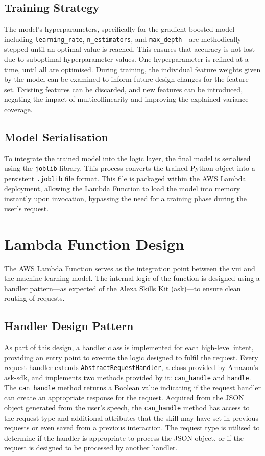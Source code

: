 \subsection{Training Strategy}
The model's hyperparameters, specifically for the gradient boosted model---including \texttt{learnin\-g\_r\-ate}, \texttt{n\_estimators}, and \texttt{max\_depth}---are methodically stepped until an optimal value is reached. This ensures that accuracy is not lost due to suboptimal hyperparameter values. One hyperparameter is refined at a time, until all are optimised. During training, the individual feature weights given by the model can be examined to inform future design changes for the feature set. Existing features can be discarded, and new features can be introduced, negating the impact of multicollinearity and improving the explained variance coverage.

\subsection{Model Serialisation}
To integrate the trained model into the logic layer, the final model is serialised using the \texttt{joblib} library. This process converts the trained Python object into a persistent \texttt{.joblib} file format. This file is packaged within the AWS Lambda deployment, allowing the Lambda Function to load the model into memory instantly upon invocation, bypassing the need for a training phase during the user's request.

\section{Lambda Function Design}
The AWS Lambda Function serves as the integration point between the \gls{vui} and the machine learning model. The internal logic of the function is designed using a handler pattern---as expected of the Alexa Skills Kit (\gls{ask})---to ensure clean routing of requests.

\subsection{Handler Design Pattern}
\label{sub:handlerDesignpattern}
As part of this design, a handler class is implemented for each high-level intent, providing an entry point to execute the logic designed to fulfil the request. Every request handler extends \texttt{AbstractRequestHandler}, a class provided by Amazon's \gls{ask}-\gls{sdk}, and implements two methods provided by it: \texttt{can\_handle} and \texttt{handle}. The \texttt{can\_handle} method returns a Boolean value indicating if the request handler can create an appropriate response for the request. Acquired from the JSON object generated from the user's speech, the \texttt{can\_handle} method has access to the request type and additional attributes that the skill may have set in previous requests or even saved from a previous interaction. The request type is utilised to determine if the handler is appropriate to process the JSON object, or if the request is designed to be processed by another handler. 

